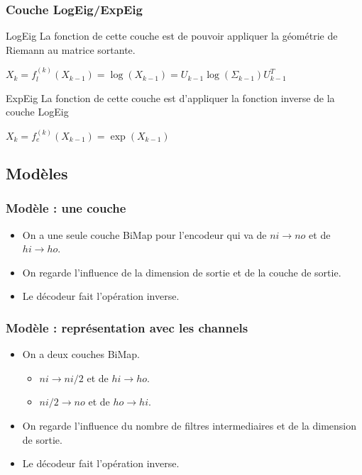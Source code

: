 \documentclass{beamer}
\begin{document}
\begin{frame}
\frametitle{Couche LogEig/ExpEig}

\begin{block}{LogEig}
La fonction de cette couche est de pouvoir appliquer la géométrie de Riemann au matrice sortante.
\end{block}

\begin{center}
    $ X_k = f_l^{(k)}(X_{k-1})=\log (X_{k-1})=U_{k-1}\log(\Sigma_{k-1})U_{k-1}^T$
\end{center}

\begin{block}{ExpEig}
La fonction de cette couche est d'appliquer la fonction inverse de la couche LogEig
\end{block}

\begin{center}
    $ X_k = f_e^{(k)}(X_{k-1})=\exp (X_{k-1})$
\end{center}

\end{frame}
\subsection{Modèles}
\begin{frame}
\frametitle{Modèle : une couche}
\begin{itemize}
    \item On a une seule couche BiMap pour l'encodeur qui va de $ni\rightarrow no$ et de $hi\rightarrow ho$.
    \item On regarde l'influence de la dimension de sortie et de la couche de sortie.
    \item Le décodeur fait l'opération inverse.
\end{itemize}
\end{frame}

\begin{frame}
\frametitle{Modèle : représentation avec les channels}
\begin{itemize}
    \item On a deux couches BiMap.
        \begin{itemize}
            \item $ni\rightarrow ni/2$ et de $hi\rightarrow ho$.
            \item $ni/2\rightarrow no$ et de $ho\rightarrow hi$.
        \end{itemize}
    \item On regarde l'influence du nombre de filtres intermediaires et de la dimension de sortie.
    \item Le décodeur fait l'opération inverse.
\end{itemize}
\end{frame}
\end{document}
